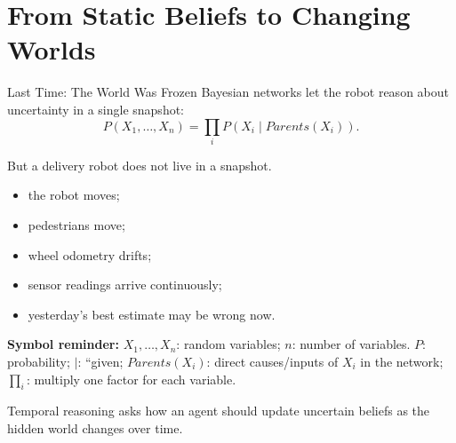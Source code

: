 \documentclass[aspectratio=169,10pt]{beamer}
\newcommand{\equationlegend}[1]{%
  \par\smallskip
  \begingroup
    \setlength{\fboxsep}{5pt}%
    \noindent\colorbox{DeckSoft}{%
      \parbox{\dimexpr\linewidth-2\fboxsep\relax}{%
        \footnotesize\textbf{Symbol reminder:} #1%
      }%
    }\par
  \endgroup
  \smallskip
}
\begin{document}

\makedecktitle

\section{From Static Beliefs to Changing Worlds}

\begin{frame}[shrink=10]{Last Time: The World Was Frozen}
  Bayesian networks let the robot reason about uncertainty in a single snapshot:
  \[
    P(X_1,\ldots,X_n)=\prod_i P(X_i\mid Parents(X_i)).
  \]

  But a delivery robot does not live in a snapshot.

  \begin{itemize}
    \item the robot moves;
    \item pedestrians move;
    \item wheel odometry drifts;
    \item sensor readings arrive continuously;
    \item yesterday's best estimate may be wrong now.
  \end{itemize}

  \equationlegend{$X_1,\ldots,X_n$: random variables; $n$: number of variables. $P$: probability; $\mid$: ``given; $Parents(X_i)$: direct causes/inputs of $X_i$ in the network; $\prod_i$: multiply one factor for each variable.}

  \begin{keyidea}
    Temporal reasoning asks how an agent should update uncertain beliefs as the hidden world changes over time.
  \end{keyidea}
\end{frame}
\end{document}
